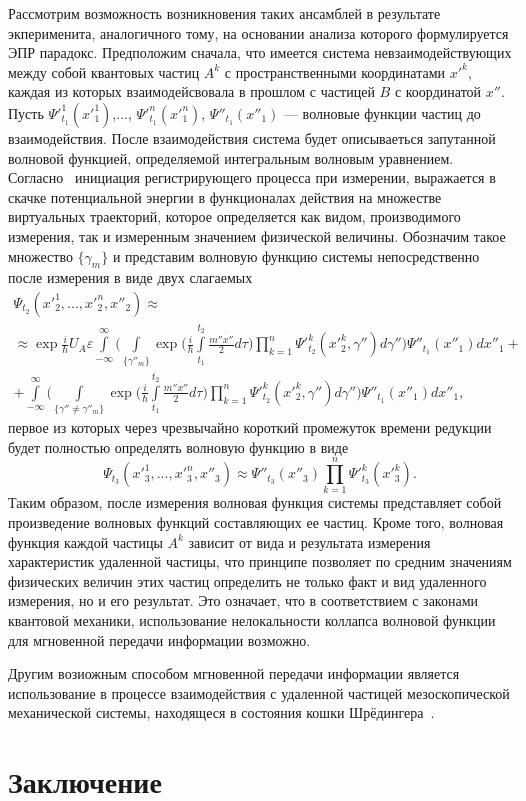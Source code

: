 \documentclass[10pt,twoside,book,a5paper]{ncc}
\begin{document}
Рассмотрим возможность возникновения таких ансамблей в результате экперименита, аналогичного тому, на основании анализа которого формулируется ЭПР парадокс. Предположим сначала, что имеется система  невзаимодействующих между собой квантовых частиц $A^{k}$ с пространственными координатами $x'^{k}$, каждая из которых взаимодейсвовала  в прошлом с частицей $B$ с координатой $x''$. Пусть $\Psi'^{1}_{t_{1}}(x'^{1}_{1})$,..., $\Psi'^{n}_{t_{1}}(x'^{n}_{1})$, $\Psi''_{t_{1}}(x''_{1})$ --- волновые функции частиц до взаимодействия. После взаимодействия система будет описываеться запутанной волновой функцией, определяемой интегральным волновым уравнением.
 Согласно~\cite{sau:6} инициация регистрирующего процесса при измерении, выражается в скачке потенциальной энергии в функционалах действия на множестве виртуальных траекторий, которое определяется как видом, производимого измерения, так и измеренным значением физической величины. Обозначим такое множество $\{\gamma_{m}\}$ и представим волновую функцию системы непосредственно после измерения в виде двух слагаемых
\begin{eqnarray*}
\Psi_{t_{2}}(x'^{1}_{2},...,x'^{n}_{2},x''_{2})\approx\\\approx\exp\frac{i}{\hbar}U_{A}\varepsilon
\int\limits_{-\infty}^{\infty}\Biggl(\int\limits_{\{\gamma''_{m}\}}\exp\biggl(\frac{i}{\hbar}\int\limits_{t_{1}}^{t_{2}}\frac{m''\dot{x''}}{2}d\tau\biggr)\prod\limits_{k=1}^{n}\Psi'^{k}_{t_{2}}(x'^{k}_{2},\gamma'')d\gamma''\Biggr)\Psi''_{t_{1}}(x''_{1})dx''_{1}+\\
+\int\limits_{-\infty}^{\infty}\Biggl(\int\limits_{\{\gamma''\neq\gamma''_{m}\}}\exp\biggl(\frac{i}{\hbar}\int\limits_{t_{1}}^{t_{2}}\frac{m''\dot{x''}}{2}d\tau\biggr)\prod\limits_{k=1}^{n}\Psi'^{k}_{t_{2}}(x'^{k}_{2},\gamma'')d\gamma''\Biggr)\Psi''_{t_{1}}(x''_{1})dx''_{1},
\end{eqnarray*}
первое из которых через чрезвычайно короткий промежуток времени редукции будет полностью определять волновую функцию в виде
\begin{equation*}
\Psi_{t_{3}}(x'^{1}_{3},...,x'^{n}_{3},x''_{3})\approx\Psi''_{t_{3}}(x''_{3})\prod\limits_{k=1}^{n}\Psi'^{k}_{t_{3}}(x'^{k}_{3}).
\end{equation*}
Таким образом, после измерения волновая функция системы представляет собой произведение волновых функций составляющих ее частиц. Кроме того, волновая функция каждой частицы $A^{k}$ зависит от вида и результата измерения характеристик удаленной частицы, что принципе позволяет по средним значениям физических величин этих частиц определить не только факт и вид удаленного измерения, но и его результат. Это означает, что в соответствием с законами квантовой механики, использование нелокальности коллапса волновой функции для мгновенной передачи информации возможно.
 
Другим возиожным способом мгновенной передачи информации является использование в процессе взаимодействия с удаленной частицей мезоскопической механической системы, находящеся в состояния кошки Шрёдингера~\cite{sau:7}.




\section*{Заключение}
\end{document}
